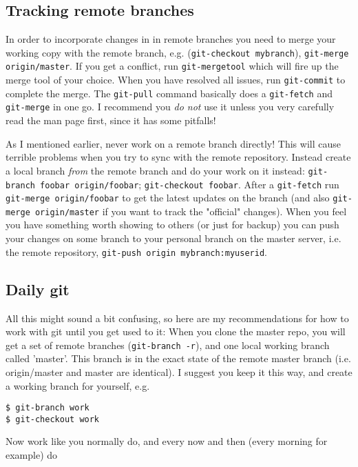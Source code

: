 \documentclass[a4paper,10pt]{article}
\begin{document}
\subsection{Tracking remote branches}
In order to incorporate changes in in remote branches you need to merge your
working copy with the remote branch, e.g. (\texttt{git-checkout mybranch}),
\texttt{git-merge
origin/master}. If you get a conflict, run \texttt{git-mergetool} which will fire up the
merge tool of your choice. When you have resolved all issues, run
\texttt{git-commit}
to complete the merge. The \texttt{git-pull} command basically does a
\texttt{git-fetch} and
\texttt{git-merge} in one go. I recommend you \emph{do not} use it unless you very carefully
read the man page first, since it has some pitfalls!

As I mentioned earlier, never work on a remote branch directly! This will
cause terrible problems when you try to sync with the remote repository.
Instead create a local branch \emph{from} the remote branch and do your work
on it instead: \texttt{git-branch foobar origin/foobar}; \texttt{git-checkout
foobar}. After a \texttt{git-fetch} run \texttt{git-merge origin/foobar} to
get the latest updates on the branch (and also \texttt{git-merge
origin/master} if you want to track the "official" changes).  When you feel
you have something worth showing to others (or just for backup) you can push
your changes on some branch to your personal branch on the master server, i.e.
the remote repository, \texttt{git-push origin mybranch:myuserid}.

\subsection{Daily git}
All this might sound a bit confusing, so here are my recommendations for
how to work with git until you get used to it:
When you clone the master repo, you will get a set of remote branches
(\texttt{git-branch -r}), and one local working branch called 'master'. This branch is
in the exact state of the remote master branch (i.e. origin/master and master
are identical). I suggest you keep it this way, and create a working branch
for yourself, e.g. 

\begin{verbatim}
$ git-branch work
$ git-checkout work 
\end{verbatim}

Now work like you normally do, and every now and then (every morning for
example) do
\end{document}

